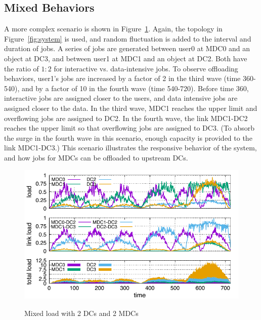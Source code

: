 \subsection{Mixed Behaviors}

A more complex scenario is shown in Figure~\ref{fig:mixed}.
Again, the topology in Figure~\ref{fig:system} is used, and
random fluctuation is added to the interval and duration of jobs.
A series of jobs are generated
between user0 at MDC0 and an object at DC3, and
between user1 at MDC1 and an object at DC2.
Both have the ratio of $1:2$ for interactive vs. data-intensive jobs.
To observe offloading behaviors, user1's jobs are increased by a
factor of 2 in the third wave (time 360-540), and by a factor of 10 in
the fourth wave (time 540-720). 
Before time 360, interactive jobs are assigned closer to the users,
and data intensive jobs are assigned closer to the data.
In the third wave, MDC1 reaches the upper limit and overflowing jobs are
assigned to DC2.
In the fourth wave, the link MDC1-DC2 reaches the upper limit so that
overflowing jobs are assigned to DC3.
(To absorb the surge in the fourth wave in this scenario, enough
capacity is provided to the link MDC1-DC3.)
This scenario illustrates the responsive behavior of the system,
and how jobs for MDCs can be offloaded to upstream DCs.

\begin{figure}[tb]
  \begin{center}
    \includegraphics[width=1.0\columnwidth]{simu2.pdf}
    \vspace{-2.0ex}
    \caption{Mixed load with 2 DCs and 2 MDCs}
    \label{fig:mixed}
  \end{center}
\end{figure}

